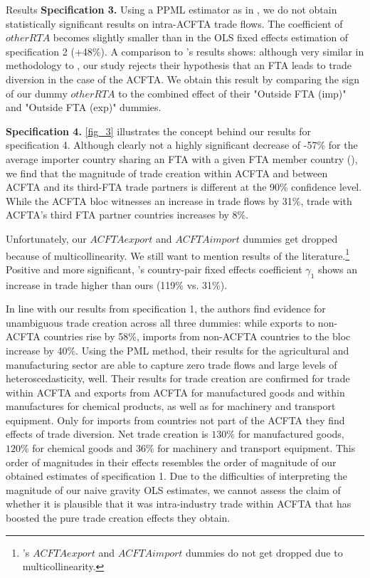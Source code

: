 \begin{section}{Results}
\textbf{Specification 3.}
Using a PPML estimator as in \cite{dyz_2014}, we do not obtain statistically significant results on intra-ACFTA trade flows. The coefficient of $otherRTA$ becomes slightly smaller than in the OLS fixed effects estimation of specification 2 (+48\%). A comparison to \cite{dyz_2014}'s results shows: although very similar in methodology to \cite{dyz_2014}, our study rejects their hypothesis that an FTA leads to trade diversion in the case of the ACFTA. We obtain this result by comparing the sign of our dummy $otherRTA$ to the combined effect of their "Outside FTA (imp)" and "Outside FTA (exp)" dummies.

\textbf{Specification 4.}
\autoref{fig_3} illustrates the concept behind our results for specification 4. Although clearly not a highly significant decrease of -57\% for the average importer country sharing an FTA with a given FTA member country (\cite{dyz_2014}), we find that the magnitude of trade creation within ACFTA and between ACFTA and its third-FTA trade partners is different at the 90\% confidence level. While the ACFTA bloc witnesses an increase in trade flows by 31\%, trade with ACFTA's third FTA partner countries increases by 8\%.  

Unfortunately, our $ACFTAexport$ and $ACFTAimport$ dummies get dropped because of multicollinearity. We still want to mention results of the literature.\footnote{\cite{smz2014}'s $ACFTAexport$ and $ACFTAimport$ dummies do not get dropped due to multicollinearity.} Positive and more significant, \cite{smz2014}'s country-pair fixed effects coefficient $\gamma_1$ shows an increase in trade higher than ours (119\% vs. 31\%). 

In line with our results from specification 1, the authors find evidence for unambiguous trade creation across all three dummies: while exports to non-ACFTA countries rise by 58\%, imports from non-ACFTA countries to the bloc increase by 40\%. Using the PML method, their results for the agricultural and manufacturing sector are able to capture zero trade flows and large levels of heteroscedasticity, well. Their results for trade creation are confirmed for trade within ACFTA and exports from ACFTA for manufactured goods and within manufactures for chemical products, as well as for machinery and transport equipment. Only for imports from countries not part of the ACFTA they find effects of trade diversion. Net trade creation is $130\%$ for manufactured goods, $120\%$ for chemical goods and $36\%$ for machinery and transport equipment. This order of magnitudes in their effects resembles the order of magnitude of our obtained estimates of specification 1. Due to the difficulties of interpreting the magnitude of our naive gravity OLS estimates, we cannot assess the claim of \cite{wla_2021} whether it is plausible that it was intra-industry trade within ACFTA that has boosted the pure trade creation effects they obtain.

\end{section}